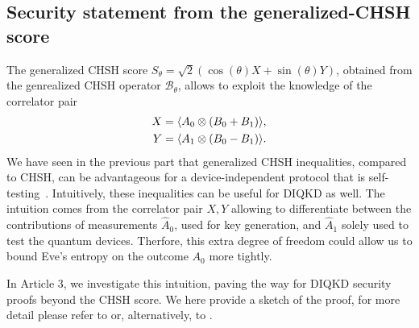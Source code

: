 \subsection{Security statement from the generalized-CHSH score}
\label{sec:Pavel}

The generalized CHSH score $S_\theta=\sqrt{2}(\cos(\theta)X+\sin(\theta)Y)$, obtained from the genrealized CHSH operator $\mathcal{B}_\theta$, allows to exploit the knowledge of the correlator pair
\begin{equation}
	\begin{split}
		X = \langle {A_0 \otimes (B_0+B_1)} \rangle,\\
		Y = \langle {A_1 \otimes (B_0-B_1)} \rangle.
	\end{split}
\end{equation}
We have seen in the previous part that generalized CHSH inequalities, compared to CHSH, can be advantageous for a device-independent protocol that is self-testing~\cite{Valcarce2022}.
Intuitively, these inequalities can be useful for DIQKD as well.
The intuition comes from the correlator pair $X,Y$ allowing to differentiate between the contributions of measurements $\hat{A}_0$, used for key generation, and $\hat{A}_1$ solely used to test the quantum devices.
Therfore, this extra degree of freedom could allow us to bound Eve's entropy on the outcome $A_0$ more tightly.

In Article 3, we investigate this intuition, paving the way for DIQKD security proofs beyond the CHSH score. 
We here provide a sketch of the proof, for more detail please refer to \cite{Sekatski2021} or, alternatively, to \cite{Woodhead2021}.


\medbreak

